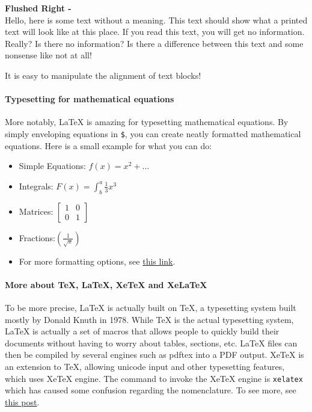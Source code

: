 \documentclass[a4paper]{qgabe-worksheet}
\begin{document}
\flushright
\textbf{Flushed Right -  }\\
Hello, here is some text without a meaning. This text should show what a printed text will look like at this place. If you read this text, you will get no information. Really? Is there no information? Is there a difference between this text and some nonsense like not at all!
\linebreak

\flushleft
It is easy to manipulate the alignment of text blocks! 

\paragraph{Typesetting for mathematical equations}
\flushleft
More notably, LaTeX is amazing for typesetting mathematical equations. By simply enveloping equations in \texttt{\$}, you can create neatly formatted mathematical equations. Here is a small example for what you can do: \\
\begin{itemize}
	\item Simple Equations: $f(x) = x^2 + \dotsc$
	\item Integrals: $F(x) = \int^a_b \frac{1}{3}x^3$
	\item Matrices: $\left[\begin{matrix}1 & 0\\0 & 1\end{matrix}\right]$
	\item Fractions:$ \left(\frac{1}{\sqrt{x}}\right)$
	\item For more formatting options, see \href{https://en.wikibooks.org/wiki/LaTeX/Mathematics}{this link}.
\end{itemize}

\paragraph{More about \TeX{}, \LaTeX{}, XeTeX and XeLaTeX}
\flushleft
To be more precise, \LaTeX{} is actually built on \TeX{}, a typesetting system built mostly by Donald Knuth in 1978. While TeX is the actual typesetting system, LaTeX is actually a set of macros that allows people to quickly build their documents without having to worry about tables, sections, etc. LaTeX files can then be compiled by several engines such as pdftex into a PDF output. XeTeX is an extension to TeX, allowing unicode input and other typesetting features, which uses XeTeX engine. The command to invoke the XeTeX engine is \texttt{xelatex} which has caused some confusion regarding the nomenclature. To see more, see \href{https://tex.stackexchange.com/questions/296616/questions-regarding-the-distinction-between-xetex-and-xelatex-and-how-they-relat}{this post}.

\watermark %
\newpage{} %
\end{document}
